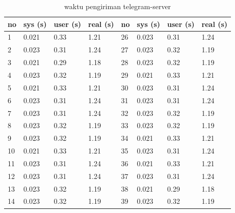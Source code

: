 \begin{table}[H]
	\centering
	\caption{waktu pengiriman telegram-server}
	\label{waktu pengiriman telegram-server}
	\begin{tabular}{|l|l|l|l|l|l|l|l|}
		\hline
		no & \multicolumn{1}{c|}{sys (s)} & \multicolumn{1}{c|}{user (s)} & real (s) & \multicolumn{1}{c|}{no} & sys (s) & user (s) & real (s) \\ \hline
		1  & 0.021                        & 0.33                          & 1.21     & 26                      & 0.023   & 0.31     & 1.24     \\ \hline
		2  & 0.023                        & 0.31                          & 1.24     & 27                      & 0.023   & 0.32     & 1.19     \\ \hline
		3  & 0.021                        & 0.29                          & 1.18     & 28                      & 0.023   & 0.32     & 1.19     \\ \hline
		4  & 0.023                        & 0.32                          & 1.19     & 29                      & 0.021   & 0.33     & 1.21     \\ \hline
		5  & 0.021                        & 0.33                          & 1.21     & 30                      & 0.023   & 0.31     & 1.24     \\ \hline
		6  & 0.023                        & 0.31                          & 1.24     & 31                      & 0.023   & 0.31     & 1.24     \\ \hline
		7  & 0.023                        & 0.31                          & 1.24     & 32                      & 0.023   & 0.32     & 1.19     \\ \hline
		8  & 0.023                        & 0.32                          & 1.19     & 33                      & 0.023   & 0.32     & 1.19     \\ \hline
		9  & 0.023                        & 0.32                          & 1.19     & 34                      & 0.021   & 0.33     & 1.21     \\ \hline
		10 & 0.021                        & 0.33                          & 1.21     & 35                      & 0.023   & 0.31     & 1.24     \\ \hline
		11 & 0.023                        & 0.31                          & 1.24     & 36                      & 0.021   & 0.33     & 1.21     \\ \hline
		12 & 0.023                        & 0.31                          & 1.24     & 37                      & 0.023   & 0.31     & 1.24     \\ \hline
		13 & 0.023                        & 0.32                          & 1.19     & 38                      & 0.021   & 0.29     & 1.18     \\ \hline
		14 & 0.023                        & 0.32                          & 1.19     & 39                      & 0.023   & 0.32     & 1.19     \\ \hline
	\end{tabular}
\end{table}

